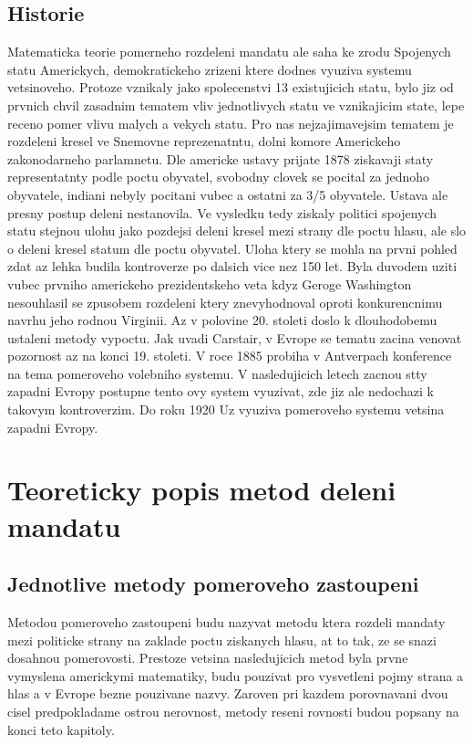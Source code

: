 \documentclass[12pt,a4paper]{report}
\begin{document}
\section{Historie}
Matematicka teorie pomerneho rozdeleni mandatu ale saha ke zrodu Spojenych statu Americkych, demokratickeho zrizeni ktere dodnes vyuziva systemu vetsinoveho.\autocite{BAL2}
Protoze vznikaly jako spolecenstvi 13 existujicich statu, bylo jiz od prvnich chvil zasadnim tematem vliv jednotlivych statu ve vznikajicim state, lepe receno pomer vlivu malych a vekych statu.
Pro nas nejzajimavejsim tematem je rozdeleni kresel ve Snemovne reprezenatntu, dolni komore Americkeho zakonodarneho parlamnetu.
Dle americke ustavy prijate 1878 ziskavaji staty representatnty podle poctu obyvatel, svobodny clovek se pocital za jednoho obyvatele, indiani nebyly pocitani vubec a ostatni za 3/5 obyvatele.\autocite{CON}
Ustava ale presny postup deleni nestanovila.
Ve vysledku tedy ziskaly politici spojenych statu stejnou ulohu jako pozdejsi deleni kresel mezi strany dle poctu hlasu, ale slo o deleni kresel statum dle poctu obyvatel. 
Uloha ktery se mohla na prvni pohled zdat az lehka budila kontroverze po dalsich vice nez 150 let.
Byla duvodem uziti vubec prvniho americkeho prezidentskeho veta kdyz Geroge Washington nesouhlasil se zpusobem rozdeleni ktery znevyhodnoval oproti konkurencnimu navrhu jeho rodnou Virginii.\autocite{BAL1}
Az v polovine 20. stoleti doslo k dlouhodobemu ustaleni metody vypoctu.
Jak uvadi Carstair, v Evrope se tematu zacina venovat pozornost az na konci 19. stoleti.
V roce 1885 probiha v Antverpach konference na tema pomeroveho volebniho systemu.
V nasledujicich letech zacnou stty zapadni Evropy postupne tento ovy system vyuzivat, zde jiz ale nedochazi k takovym kontroverzim.
Do roku 1920 Uz vyuziva pomeroveho systemu vetsina zapadni Evropy.\autocite{BOO}

\chapter{Teoreticky popis metod deleni mandatu}

\section{Jednotlive metody pomeroveho zastoupeni}
Metodou pomeroveho zastoupeni budu nazyvat metodu ktera rozdeli mandaty mezi politicke strany na zaklade poctu ziskanych hlasu, at to tak, ze se snazi dosahnou pomerovosti.
Prestoze vetsina nasledujicich metod byla prvne vymyslena americkymi matematiky, budu pouzivat pro vysvetleni pojmy strana a hlas a v Evrope bezne pouzivane nazvy.
Zaroven pri kazdem porovnavani dvou cisel predpokladame ostrou nerovnost, metody reseni rovnosti budou popsany na konci teto kapitoly.
\end{document}
